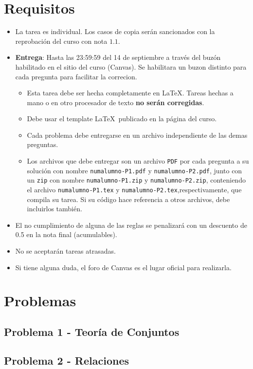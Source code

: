 \documentclass[12pt]{article}
\begin{document}
\section*{Requisitos}
\begin{itemize}

  \item La tarea es individual. Los casos de copia serán sancionados con la
   reprobación del curso con nota $1.1$.

  \item \textbf{Entrega}: Hasta las 23:59:59 del 14 de septiembre a través del buzón habilitado en el sitio del curso (Canvas).
  Se habilitara un buzon distinto para cada pregunta para facilitar la correcion.

  \begin{itemize}

    \item Esta tarea debe ser hecha completamente en \LaTeX. Tareas hechas a mano o
    en otro procesador de texto \textbf{no serán corregidas}.

    \item Debe usar el template \LaTeX\ publicado en la página del curso.

    \item Cada problema debe entregarse en un archivo independiente de las demas preguntas.
    

    \item Los archivos que debe entregar son un archivo \texttt{PDF} por cada pregunta
    a su solución con nombre \texttt{numalumno-P1.pdf} y \texttt{numalumno-P2.pdf}, 
    junto con un \texttt{zip} con nombre \texttt{numalumno-P1.zip} y \texttt{numalumno-P2.zip}, 
    conteniendo el archivo \texttt{numalumno-P1.tex} y \texttt{numalumno-P2.tex},respectivamente, 
    que compila su tarea. 
    Si su código hace referencia a otros archivos, debe incluirlos también.


  \end{itemize}

  \item El no cumplimiento de alguna de las reglas se penalizará con un descuento de 0.5 en la nota final (acumulables).

  \item No se aceptarán tareas atrasadas.

  \item Si tiene alguna duda, el foro de Canvas es el lugar oficial para realizarla.
\end{itemize}



\section*{Problemas}

    \subsection*{Problema 1 - Teoría de Conjuntos}
      
    \newpage
     \subsection*{Problema 2 - Relaciones}
      
\end{document}
